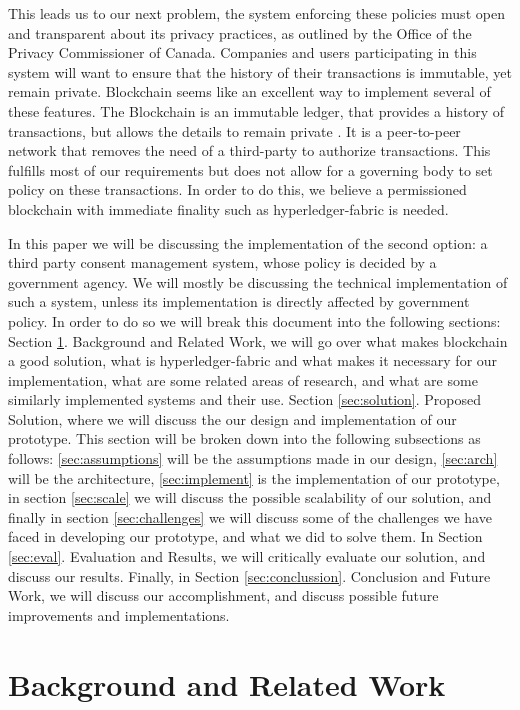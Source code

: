 \documentclass[11pt,journal]{IEEEtran}
\begin{document}
This leads us to our next problem, the system enforcing these policies must open and transparent about its privacy practices, as outlined by the Office of the Privacy Commissioner of Canada.  Companies and users participating in this system will want to ensure that the history of  their transactions is immutable, yet remain private.  Blockchain seems like an excellent way to implement several of these features.  The Blockchain is an immutable ledger, that provides a history of transactions, but allows the details to remain private \cite{nakamoto2008bitcoin}.  It is a peer-to-peer network that removes the need of a third-party to authorize transactions.  This fulfills most of our requirements but does not allow for a governing body to set policy on these transactions.  In order to do this, we believe a permissioned blockchain with immediate finality \cite{cachin2016architecture} such as hyperledger-fabric is needed.


In this paper we will be discussing the implementation of the second option: a third party consent management system, whose policy is decided by a government agency.  We will mostly be discussing the technical implementation of such a system, unless its implementation is directly affected by government policy.  In order to do so we will break this document into the following sections: Section \ref{sec:related}. Background and Related Work, we will go over what makes blockchain a good solution, what is hyperledger-fabric and what makes it necessary for our implementation, what are some related areas of research, and what are some similarly implemented systems and their use.  Section \ref{sec:solution}. Proposed Solution, where we will discuss the our design and implementation of our prototype.  This section will be broken down into the following subsections as follows: \ref{sec:assumptions} will be the assumptions made in our design, \ref{sec:arch} will be the architecture, \ref{sec:implement} is the implementation of our prototype, in section \ref{sec:scale} we will discuss the possible scalability of our solution, and finally in section \ref{sec:challenges} we will discuss some of the challenges we have faced in developing our prototype, and what we did to solve them.  In Section \ref{sec:eval}. Evaluation and Results, we will critically evaluate our solution, and discuss our results.  Finally, in Section \ref{sec:conclussion}. Conclusion and Future Work, we will discuss our accomplishment, and discuss possible future improvements and implementations.


\section{Background and Related Work} \label{sec:related}
\end{document}
